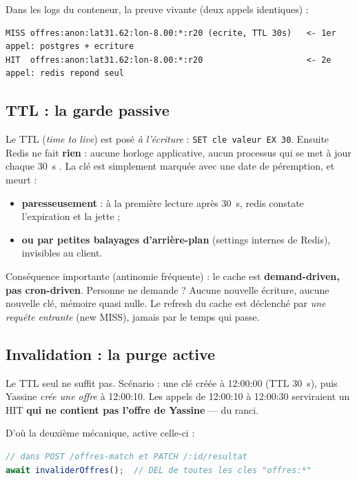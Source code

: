 \documentclass[11pt,a4paper]{article}
\begin{document}
Dans les logs du conteneur, la preuve vivante (deux appels identiques) :

\begin{lstlisting}[language=console]
MISS offres:anon:lat31.62:lon-8.00:*:r20 (ecrite, TTL 30s)   <- 1er appel: postgres + ecriture
HIT  offres:anon:lat31.62:lon-8.00:*:r20                     <- 2e appel: redis repond seul
\end{lstlisting}

\subsection{TTL : la garde passive}

Le TTL (\emph{time to live}) est posé \emph{à l'écriture} :
\texttt{SET cle valeur EX 30}. Ensuite Redis ne fait \textbf{rien} : aucune
horloge applicative, aucun processus qui \og se met à jour chaque 30~s \fg{}.
La clé est simplement marquée avec une date de péremption, et meurt :
\begin{itemize}[nosep]
  \item \textbf{paresseusement} : à la première lecture après 30~s, redis
        constate l'expiration et la jette ;
  \item \textbf{ou par petites balayages d'arrière-plan} (settings internes
        de Redis), invisibles au client.
\end{itemize}
Conséquence importante (antinomie fréquente) : le cache est
\textbf{demand-driven, pas cron-driven}. Personne ne demande ?
Aucune nouvelle écriture, aucune nouvelle clé, mémoire quasi nulle.
Le \og refresh \fg{} du cache est déclenché par \emph{une requête entrante}
(new MISS), jamais par le temps qui passe.

\subsection{Invalidation : la purge active}

Le TTL seul ne suffit pas. Scénario : une clé créée à 12:00:00 (TTL 30~s),
puis Yassine \emph{crée une offre} à 12:00:10. Les appels de 12:00:10 à
12:00:30 serviraient un HIT \textbf{qui ne contient pas l'offre de Yassine}
--- du ranci.

D'où la deuxième mécanique, active celle-ci :

\begin{lstlisting}[language=TypeScript]
// dans POST /offres-match et PATCH /:id/resultat
await invaliderOffres();  // DEL de toutes les cles "offres:*"
\end{lstlisting}
\end{document}
